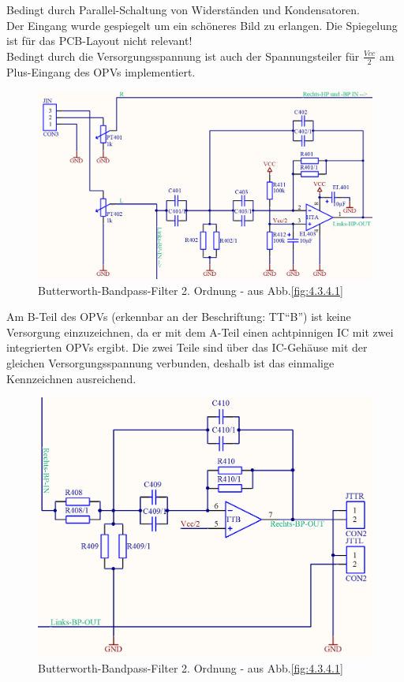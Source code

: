 Bedingt durch Parallel-Schaltung von Widerständen und Kondensatoren.\\ 
Der Eingang wurde gespiegelt um ein schöneres Bild zu erlangen.
Die Spiegelung ist für das PCB-Layout nicht relevant!\\
Bedingt durch die Versorgungsspannung ist auch der Spannungsteiler für $\frac{Vcc}{2}$ am Plus-Eingang des OPVs implementiert.
\begin{figure} [H]
	\centering	
	\includegraphics[width=1\textwidth]{img/Print4/4_TTuHTWeiche-LinksHP-Schematic.PNG}
	\caption{Butterworth-Bandpass-Filter 2. Ordnung - aus Abb.\ref{fig:4.3.4.1}}
	\label {fig:4.3.4.2}
\end{figure}
Am B-Teil des OPVs (erkennbar an der Beschriftung: TT\enquote{B}) ist keine Versorgung einzuzeichnen, da er mit dem A-Teil einen achtpinnigen IC mit zwei integrierten OPVs ergibt.
Die zwei Teile sind über das IC-Gehäuse mit der gleichen Versorgungsspannung verbunden, deshalb ist das einmalige Kennzeichnen ausreichend.\\
\begin{figure} [H]
	\centering	
	\includegraphics[width=1\textwidth]{img/Print4/4_TTuHTWeiche-RechtsBP-Schematic.PNG}
	\caption{Butterworth-Bandpass-Filter 2. Ordnung - aus Abb.\ref{fig:4.3.4.1}}
	\label {fig:4.3.4.3}
\end{figure}

